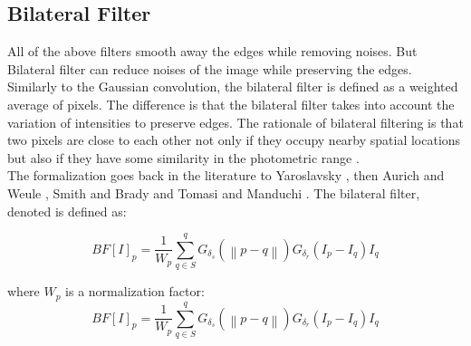 \newpage
\subsection{Bilateral Filter}
 All of the above filters smooth away the edges while removing noises. But Bilateral filter can reduce noises of the image while preserving the edges. Similarly to the Gaussian convolution, the bilateral filter is defined as a weighted average of pixels. The difference is that the bilateral filter takes into account the variation of intensities to preserve edges. The rationale of bilateral filtering is that two pixels are close to each other not only if they occupy nearby spatial locations but also if they have some similarity in the
photometric range \cite{Paris}.\\

The formalization goes back in the literature to Yaroslavsky \cite{Yaroslavsky}, then Aurich
and Weule \cite{Aurich}, Smith and Brady \cite{Smith} and Tomasi and Manduchi \cite{Tomasi}. The bilateral filter, denoted is defined as:
 
\begin{displaymath}
BF\left [ I \right ]_{p} = \frac{1}{W_{p}}\sum_{q\in S}^{q}G_{\delta _{s}}\left ( \left \| p-q \right \| \right )G_{\delta _{r}}\left ( I_{p}-I_{q} \right )I_{q}
\end{displaymath}

where $W_{p}$ is a normalization factor:
\begin{displaymath}
BF\left [ I \right ]_{p} = \frac{1}{W_{p}}\sum_{q\in S}^{q}G_{\delta _{s}}\left ( \left \| p-q \right \| \right )G_{\delta _{r}}\left ( I_{p}-I_{q} \right )I_{q}
\end{displaymath}

